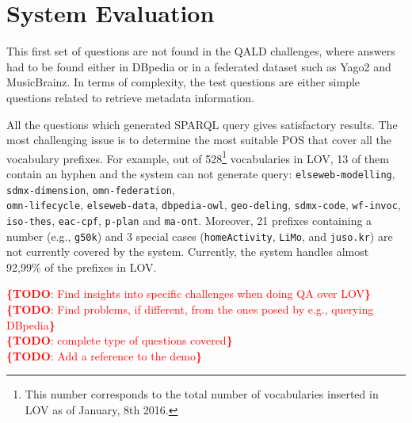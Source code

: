 \documentclass[runningheads,a4paper]{llncs}
\newcommand{\todo}[1]{\noindent\textcolor{red}{{\bf \{TODO}: #1{\bf \}}}}
\begin{document}

\section{System Evaluation}
\label{sec:evaluation}

This first set of questions are not found in the QALD challenges, where answers had to be found either in DBpedia or in a federated dataset such as Yago2 and MusicBrainz. In terms of complexity, the test questions are either simple questions related to retrieve metadata information. 

All the questions which generated SPARQL query gives satisfactory results. The most challenging issue is to determine the most suitable POS that cover all the vocabulary prefixes. For example, out of 528\footnote{This number corresponds to the total number of vocabularies inserted in LOV as of January, 8th 2016.} vocabularies in LOV, 13 of them contain an hyphen and the system can not generate query: \texttt{elseweb-modelling}, \texttt{sdmx-dimension}, \texttt{omn-federation}, \\ \texttt{omn-lifecycle}, \texttt{elseweb-data}, \texttt{dbpedia-owl}, \texttt{geo-deling}, \texttt{sdmx-code}, \texttt{wf-invoc}, \texttt{iso-thes}, \texttt{eac-cpf}, \texttt{p-plan} and \texttt{ma-ont}. Moreover, 21 prefixes containing a number (e.g., \texttt{g50k}) and 3 special cases (\texttt{homeActivity}, \texttt{LiMo}, and \texttt{juso.kr}) are not currently covered by the system. Currently, the system handles almost 92,99\% of the prefixes in LOV.

\todo{Find insights into specific challenges when doing QA over LOV}\\
\todo{Find problems, if different, from the ones posed by e.g., querying DBpedia}\\
\todo{complete type of questions covered}\\
\todo{Add a reference to the demo}




\end{document}

